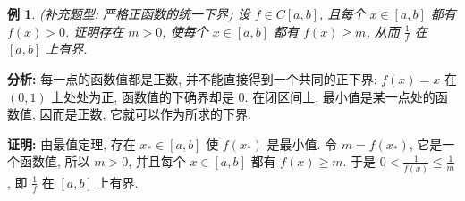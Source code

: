 \documentclass[UTF8,openany]{ctexbook}
\theoremstyle{chinesetextbook}
\newtheorem{example}{例}[section]
\newenvironment{cnproof}{\par\indent\textbf{证明:} \ignorespaces}{\par}
\begin{document}
\begin{example}
\textnormal{(补充题型: 严格正函数的统一下界)} 设 $f\in C[a,b]$, 且每个 $x\in[a,b]$ 都有 $f(x)>0$. 证明存在 $m>0$, 使每个 $x\in[a,b]$ 都有 $f(x)\ge m$, 从而 $\displaystyle\frac1f$ 在 $[a,b]$ 上有界.
\end{example}
\par\indent\textbf{分析:} 每一点的函数值都是正数, 并不能直接得到一个共同的正下界: $f(x)=x$ 在 $(0,1)$ 上处处为正, 函数值的下确界却是 $0$. 在闭区间上, 最小值是某一点处的函数值, 因而是正数, 它就可以作为所求的下界.
\begin{cnproof}
由最值定理, 存在 $x_*\in[a,b]$ 使 $f(x_*)$ 是最小值. 令 $m=f(x_*)$, 它是一个函数值, 所以 $m>0$, 并且每个 $x\in[a,b]$ 都有 $f(x)\ge m$. 于是 $\displaystyle0<\frac1{f(x)}\le\frac1m$, 即 $\displaystyle\frac1f$ 在 $[a,b]$ 上有界.
\end{cnproof}
\end{document}
